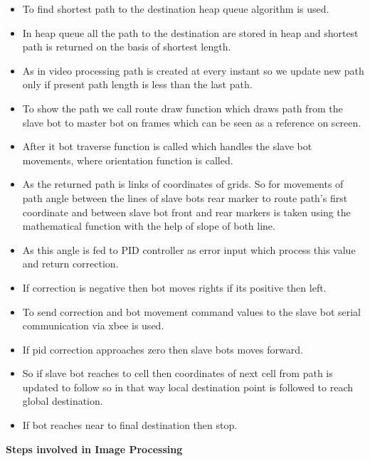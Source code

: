 \documentclass[report]{res}
\begin{document}
\begin{itemize}
		\item To find shortest path to the destination heap queue algorithm is used. 
		\item In heap queue all the path to the destination are stored in heap and shortest path is returned on the basis of shortest length. 
		\item As in video processing path is created at every instant so we update new path only if present path length is less than the last path. 
		\item To show the path we call route draw function which draws path from the slave bot to master bot on frames which can be seen as a reference on screen. 
		\item After it bot traverse function is called which handles the slave bot movements, where orientation function is called. 
		\item As the returned path is links of coordinates of grids. So for movements of path angle between the lines of slave bots rear marker to route path’s first coordinate and between slave bot front and rear markers is taken using the mathematical function with the help of slope of both line. 
		\item As this angle is fed to PID controller as error input which process this value and return correction. 
		\item If correction is negative then bot moves rights if its positive then left. 
		\item To send correction and bot movement command values to the slave bot serial communication via xbee is used. 
		\item If pid correction approaches zero then slave bots moves forward. 
		\item So if slave bot reaches to cell then coordinates of next cell from path is updated to follow so in that way local destination point is followed to reach global destination. 
		\item If bot reaches near to final destination then stop.
	\end{itemize}
	
	\pagebreak
	
	
	\textbf{Steps involved in Image Processing}
	
\end{document}
